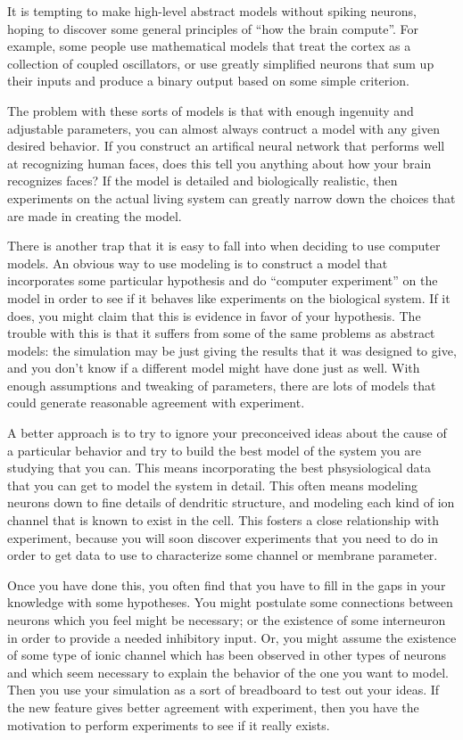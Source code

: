 \documentclass[12pt]{article}
\begin{document}
It is tempting to make high-level abstract models without spiking neurons, hoping to discover some general principles of ``how the brain compute''. For example, some people use mathematical models that treat the cortex as a collection of coupled oscillators, or use greatly simplified neurons that sum up their inputs and produce a binary output based on some simple criterion.

The problem with these sorts of models is that with enough ingenuity and adjustable parameters, you can almost always contruct a model with any given desired behavior. If you construct an artifical neural network that performs well at recognizing human faces, does this tell you anything about how your brain recognizes faces? If the model is detailed and biologically realistic, then experiments on the actual living system can greatly narrow down the choices that are made in creating the model.

There is another trap that it is easy to fall into when deciding to use computer models. An obvious way to use modeling is to construct a model that incorporates some particular hypothesis and do ``computer experiment'' on the model in order to see if it behaves like experiments on the biological system. If it does, you might claim that this is evidence in favor of your hypothesis. The trouble with this is that it suffers from some of the same problems as abstract models: the simulation may be just giving the results that it was designed to give, and you don't know if a different model might have done just as well. With enough assumptions and tweaking of parameters, there are lots of models that could generate reasonable agreement with experiment.

A better approach is to try to ignore your preconceived ideas about the cause of a particular behavior and try to build the best model of the system you are studying that you can. This means incorporating the best phsysiological data that you can get to model the system in detail. This often means modeling neurons down to fine details of dendritic structure, and modeling each kind of ion channel that is known to exist in the cell. This fosters a close relationship with experiment, because you will soon discover experiments that you need to do in order to get data to use to characterize some channel or membrane parameter.

Once you have done this, you often find that you have to fill in the gaps in your knowledge with some hypotheses. You might postulate some connections between neurons which you feel might be necessary; or the existence of some interneuron in order to provide a needed inhibitory input. Or, you might assume the existence of some type of ionic channel which has been observed in other types of neurons and which seem necessary to explain the behavior of the one you want to model. Then you use your simulation as a sort of breadboard to test out your ideas. If the new feature gives better agreement with experiment, then you have the motivation to perform experiments to see if it really exists.
\end{document}
